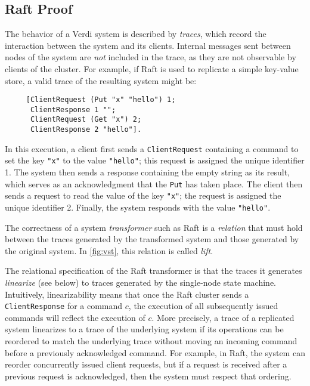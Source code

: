 \subsection{Raft Proof}\label{ssec:verdi:raft-proof}
The behavior of a Verdi system is described by \emph{traces},
   which record the interaction between the system and its clients.
Internal messages sent between nodes of the system
  are \emph{not} included in the trace,
  as they are not observable by clients of the cluster.
For example, if Raft is used to replicate a simple key-value store,
  a valid trace of the resulting system might be:
\begin{verbatim}
     [ClientRequest (Put "x" "hello") 1;
      ClientResponse 1 "";
      ClientRequest (Get "x") 2;
      ClientResponse 2 "hello"].
\end{verbatim}
In this execution, a client first sends a \texttt{ClientRequest}
  containing a command to set the key \verb|"x"| to the value \verb|"hello"|;
  this request is assigned the unique identifier 1.
The system then sends a response containing the empty string as its result,
  which serves as an acknowledgment that the \texttt{Put} has taken place.
The client then sends a request to read the value of the key \verb|"x"|;
  the request is assigned the unique identifier 2.
Finally, the system responds with the value \verb|"hello"|.

The correctness of a system \textit{transformer} such as Raft
  is a \textit{relation} that must hold between
  the traces generated by the transformed system
  and those generated by the original system.
In \cref{fig:vst}, this relation is called \textit{lift}.

The relational specification of the Raft transformer
  is that the traces it generates \textit{linearize}
  (see below)
  to traces generated by the single-node state machine.
Intuitively, linearizability means that once
  the Raft cluster sends a \texttt{ClientResponse} for a command $c$,
  the execution of all subsequently issued commands will reflect the execution of $c$.
More precisely, a trace of a replicated system linearizes to a trace
of the underlying system if its operations can be reordered to match
the underlying trace without moving an incoming command before a
previously acknowledged command.
For example, in Raft, the system can reorder concurrently issued client requests,
  but if a request is received after a previous request is acknowledged,
  then the system must respect that ordering.

